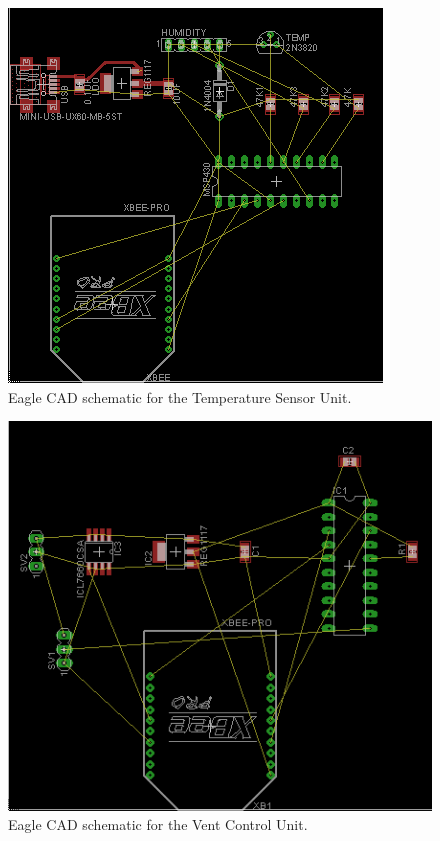 \begin{figure}[htb]
\centering
\includegraphics[width=.99\textwidth]{Temp_pcb_layout.png}
\caption{Eagle CAD schematic for the Temperature Sensor Unit.}
\label{fig:Temperature_PCB}
\end{figure}

\begin{figure}[htb]
\centering
\includegraphics[width=.99\textwidth]{Vent_pcb_layout.png}
\caption{Eagle CAD schematic for the Vent Control Unit.}
\label{fig:Vent_PCB}
\end{figure}
